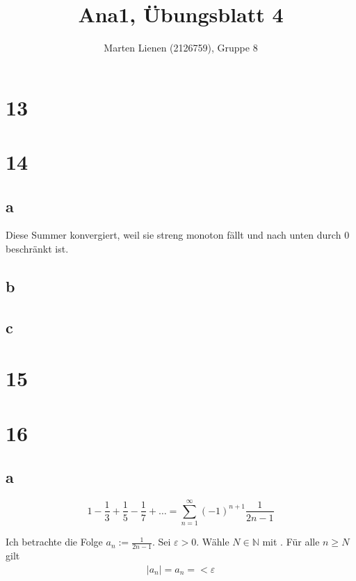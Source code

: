 \documentclass[a4paper,10pt]{article}
\title{Ana1, Übungsblatt 4}
\author{Marten Lienen (2126759), Gruppe 8}
\begin{document}
\maketitle

\section*{13}

\section*{14}

\subsection*{a}

Diese Summer konvergiert, weil sie streng monoton fällt und nach unten durch $0$ beschränkt ist.

\subsection*{b}



\subsection*{c}

\section*{15}

\section*{16}

\subsection*{a}

\begin{equation}
 1 - \frac{1}{3} + \frac{1}{5} - \frac{1}{7} + \dots = \sum_{n = 1}^\infty (-1)^{n + 1}\frac{1}{2n - 1}
\end{equation}

Ich betrachte die Folge $a_n := \frac{1}{2n - 1}$.
Sei $\varepsilon > 0$.
Wähle $N \in \mathbb{N}$ mit .
Für alle $n \ge N$ gilt
\begin{align}
 |a_n| = a_n = < \varepsilon
\end{align}
\end{document}
